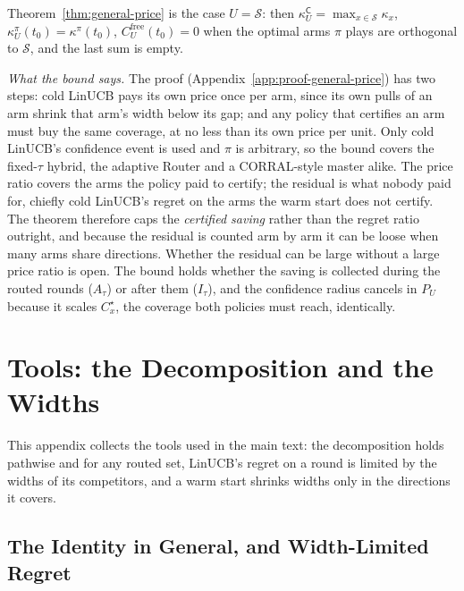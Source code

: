 \documentclass[anon]{alt2027} %
\newcommand{\Cold}{\mathsf{C}}
\begin{document}
Theorem~\ref{thm:general-price} is the case $U=\mathcal S$: then
$\kappa^{\Cold}_U=\max_{x\in\mathcal S}\kappa_x$, $\kappa^\pi_U(t_0)=\kappa^\pi(t_0)$,
$C^{\mathrm{free}}_U(t_0)=0$ when the optimal arms $\pi$ plays are orthogonal
to $\mathcal S$, and the last sum is empty.

\emph{What the bound says.} The proof (Appendix~\ref{app:proof-general-price})
has two steps: cold LinUCB pays its own price once per arm, since its own
pulls of an arm shrink that arm's width below its gap; and any policy that
certifies an arm must buy the same coverage, at no less than its own price
per unit. Only cold LinUCB's confidence event is used and $\pi$ is
arbitrary, so the bound covers the fixed-$\tau$ hybrid, the adaptive Router
and a CORRAL-style master alike. The price ratio covers the arms the policy
paid to certify; the residual is what nobody paid for, chiefly cold LinUCB's
regret on the arms the warm start does not certify. The theorem therefore
caps the \emph{certified saving} rather than the regret ratio outright, and
because the residual is counted arm by arm it can be loose when many arms
share directions. Whether the residual can be large without a large price
ratio is open. The bound holds whether the saving is collected during the
routed rounds ($A_\tau$) or after them ($I_\tau$), and the confidence radius
cancels in $P_U$ because it scales $C^\star_x$, the coverage both policies
must reach, identically.

\section{Tools: the Decomposition and the Widths}
\label{app:extra-theory}

This appendix collects the tools used in the main text: the decomposition
holds pathwise and for any routed set, LinUCB's regret on a round is limited
by the widths of its competitors, and a warm start shrinks widths only in the
directions it covers.

\subsection{The Identity in General, and Width-Limited Regret}
\label{app:width-limited}
\label{sec:width}
\end{document}
